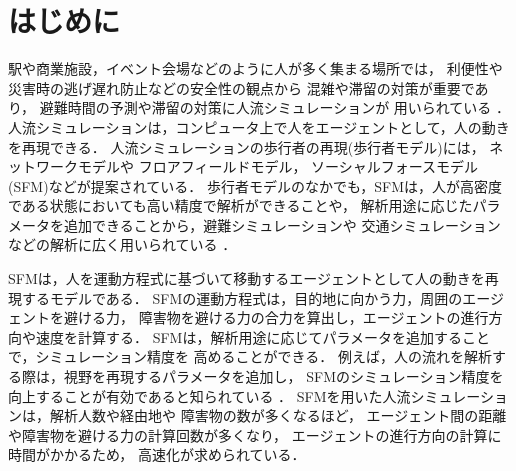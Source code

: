 \newcommand{\tensaku}[1]{}

\chapter{はじめに}
\label{sec:intro}
\tensaku{\section{人流シミュレーションの背景と需要}}
駅や商業施設，イベント会場などのように人が多く集まる場所では，
利便性や災害時の逃げ遅れ防止などの安全性の観点から
混雑や滞留の対策が重要であり\cite{taisaku1}\cite{taisaku2}，
避難時間の予測や滞留の対策に人流シミュレーションが
用いられている
\cite{sim_jirei1}\cite{sim_jirei2}\cite{sim_jirei3}\cite{sim_jirei8}\cite{sim_jirei7}．
人流シミュレーションは，コンピュータ上で人をエージェントとして，人の動きを再現できる．
人流シミュレーションの歩行者の再現(歩行者モデル)には，
ネットワークモデルや
フロアフィールドモデル\cite{floa_field3}\cite{floa_field1}\cite{floa_field2}，
ソーシャルフォースモデル(SFM)\cite{helbing_sfm}などが提案されている．
歩行者モデルのなかでも，SFMは，人が高密度である状態においても高い精度で解析ができることや，
解析用途に応じたパラメータを追加できることから，避難シミュレーションや
交通シミュレーションなどの解析に広く用いられている
\cite{mas_pandemic}\cite{sfm_hinan1}\cite{sfm_hinan2}\cite{sfm_hinan3}\cite{intro_gunshu}．

\tensaku{\section{ソーシャルフォースモデル}}
SFMは，人を運動方程式に基づいて移動するエージェントとして人の動きを再現するモデルである．
SFMの運動方程式は，目的地に向かう力，周囲のエージェントを避ける力，
障害物を避ける力の合力を算出し，エージェントの進行方向や速度を計算する．
SFMは，解析用途に応じてパラメータを追加することで，シミュレーション精度を
高めることができる．
例えば，人の流れを解析する際は，視野を再現するパラメータを追加し，
SFMのシミュレーション精度を向上することが有効であると知られている
\cite{siya_ex2}\cite{siya_ex3}\cite{siya_ex4}\cite{siya_ex5}\cite{siya_ex6}\cite{siya_ex7}．
SFMを用いた人流シミュレーションは，解析人数や経由地や
障害物の数が多くなるほど，
エージェント間の距離や障害物を避ける力の計算回数が多くなり，
エージェントの進行方向の計算に時間がかかるため，
高速化が求められている．

